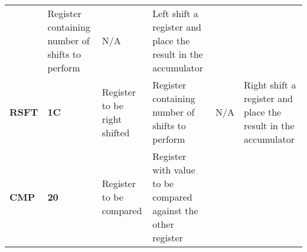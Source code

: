 \documentclass[]{article}
\begin{document}
\begin{longtable}[c]{@{}llllll@{}}
\begin{minipage}[t]{0.14\columnwidth}
\strut\end{minipage} &
\begin{minipage}[t]{0.14\columnwidth}\raggedright\strut
Register containing number of shifts to perform
\strut\end{minipage} &
\begin{minipage}[t]{0.14\columnwidth}\raggedright\strut
N/A
\strut\end{minipage} &
\begin{minipage}[t]{0.14\columnwidth}\raggedright\strut
Left shift a register and place the result in the accumulator
\strut\end{minipage}\tabularnewline
\begin{minipage}[t]{0.14\columnwidth}\raggedright\strut
\textbf{RSFT}
\strut\end{minipage} &
\begin{minipage}[t]{0.14\columnwidth}\raggedright\strut
\textbf{1C}
\strut\end{minipage} &
\begin{minipage}[t]{0.14\columnwidth}\raggedright\strut
Register to be right shifted
\strut\end{minipage} &
\begin{minipage}[t]{0.14\columnwidth}\raggedright\strut
Register containing number of shifts to perform
\strut\end{minipage} &
\begin{minipage}[t]{0.14\columnwidth}\raggedright\strut
N/A
\strut\end{minipage} &
\begin{minipage}[t]{0.14\columnwidth}\raggedright\strut
Right shift a register and place the result in the accumulator
\strut\end{minipage}\tabularnewline
\begin{minipage}[t]{0.14\columnwidth}\raggedright\strut
\textbf{CMP}
\strut\end{minipage} &
\begin{minipage}[t]{0.14\columnwidth}\raggedright\strut
\textbf{20}
\strut\end{minipage} &
\begin{minipage}[t]{0.14\columnwidth}\raggedright\strut
Register to be compared
\strut\end{minipage} &
\begin{minipage}[t]{0.14\columnwidth}\raggedright\strut
Register with value to be compared against the other register
\strut\end{minipage} &
\begin{minipage}[t]{0.14\columnwidth}\raggedright\strut

\end{minipage}
\end{longtable}
\end{document}
